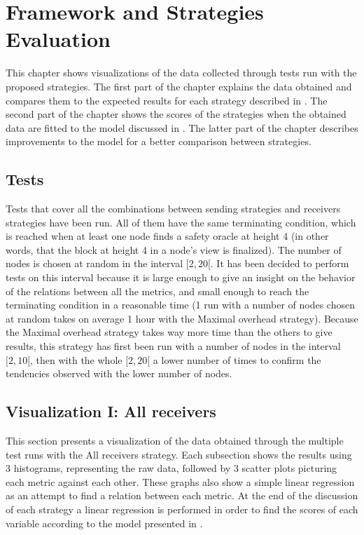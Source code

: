 \chapter{Framework and Strategies Evaluation}
\label{chap:strategies}

This chapter shows visualizations of the data collected through tests run with
the proposed strategies. The first part of the chapter explains the data
obtained and compares them to the expected results for each strategy described
in . The second part of the chapter shows the scores of the
strategies when the obtained data are fitted to the model discussed in
. The latter part of the chapter describes improvements to the
model for a better comparison between strategies.

\section{Tests}
Tests that cover all the combinations between sending strategies and receivers
strategies have been run.
All of them have the same terminating condition, which is reached when at least
one node finds a safety oracle at height 4 (in other words, that the block at
height 4 in a node's view is finalized). The number of nodes is chosen at random
in the interval \([2, 20[\). It has been decided to perform tests on this
interval because it is large enough to give an insight on the behavior of the
relations between all the metrics, and small enough to reach the terminating
condition in a reasonable time (1 run with a number of nodes chosen at random
takes on average 1 hour with the Maximal overhead strategy). Because the Maximal
overhead strategy takes way more time than the others to give results, this
strategy has first been run with a number of nodes in the interval \([2,10[\),
then with the whole \([2, 20[\) a lower number of times to confirm the
tendencies observed with the lower number of nodes.

\section{Visualization I: All receivers}
This section presents a visualization of the data obtained through the multiple
test runs with the All receivers strategy.  Each subsection shows the results
using 3 histograms, representing the raw data, followed by 3 scatter plots
picturing each metric against each other. These graphs also show a simple linear
regression as an attempt to find a relation between each metric. At the end of
the discussion of each strategy a linear regression is performed in order to
find the scores of each variable according to the model presented in
.

